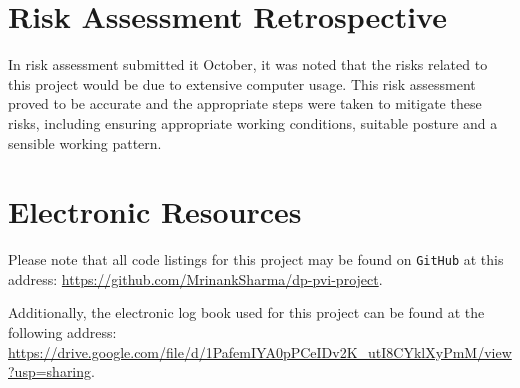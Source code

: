 \chapter{Risk Assessment Retrospective}
In risk assessment submitted it October, it was noted that the risks related to this project would be due to extensive computer usage. This risk assessment proved to be accurate and the appropriate steps were taken to mitigate these risks, including ensuring appropriate working conditions, suitable posture and a sensible working pattern. 

\chapter{Electronic Resources}
Please note that all code listings for this project may be found on \texttt{GitHub} at this address: \url{https://github.com/MrinankSharma/dp-pvi-project}. 

Additionally, the electronic log book used for this project can be found at the following address: \url{https://drive.google.com/file/d/1PafemIYA0pPCeIDv2K_utI8CYklXyPmM/view?usp=sharing}.